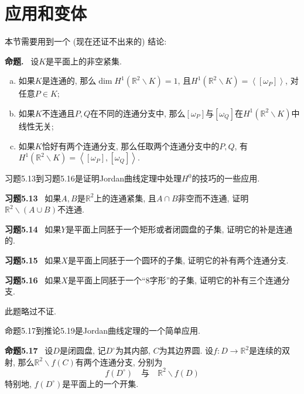 \documentclass[11pt]{article}
\theoremstyle{definition}\newtheorem*{analyse}{分析}
\theoremstyle{remark}\newtheorem{rem*}{评注}
\newenvironment{env}[1]{\par\vspace{1em}\noindent\textbf{#1}\ }{\par\vspace{1em}}
\begin{document}
\section{应用和变体}

本节需要用到一个 (现在还证不出来的) 结论:
\begin{env}{命题.}
    设$K$是平面上的非空紧集.
    \begin{enumerate}[(a)]
        \item 如果$K$是连通的, 那么$\dim H^1(\mathbb{R}^2\backslash K)=1$, 且$H^1(\mathbb{R}^2\backslash K)=\left\langle[\omega_P]\right\rangle$, 对任意$P\in K$;
        \item 如果$K$不连通且$P,Q$在不同的连通分支中, 那么$[\omega_P]$与$[\omega_Q]$在$H^1(\mathbb{R}^2\backslash K)$中线性无关;
        \item 如果$K$恰好有两个连通分支, 那么任取两个连通分支中的$P,Q$, 有$H^1(\mathbb{R}^2\backslash K)=\left\langle[\omega_P],[\omega_Q]\right\rangle$.
    \end{enumerate}
\end{env}

习题5.13到习题5.16是证明Jordan曲线定理中处理$H^0$的技巧的一些应用.
\begin{env}{习题5.13}
    如果$A,B$是$\mathbb{R}^2$上的连通紧集, 且$A\cap B$非空而不连通, 证明$\mathbb{R}^2\backslash(A\cup B)$不连通.
\end{env}

\begin{env}{习题5.14}
    如果$Y$是平面上同胚于一个矩形或者闭圆盘的子集, 证明它的补是连通的.
\end{env}

\begin{env}{习题5.15}
    如果$X$是平面上同胚于一个圆环的子集, 证明它的补有两个连通分支.
\end{env}

\begin{env}{习题5.16}
    如果$X$是平面上同胚于一个``$8$字形''的子集, 证明它的补有三个连通分支.
\end{env}
此题略过不证.

命题5.17到推论5.19是Jordan曲线定理的一个简单应用.
\begin{env}{命题5.17}
    设$D$是闭圆盘, 记$D^\circ$为其内部, $C$为其边界圆.
    设$f:D\to\mathbb{R}^2$是连续的双射, 那么$\mathbb{R}^2\backslash f(C)$有两个连通分支, 分别为
    \[f(D^\circ)\quad\text{与}\quad\mathbb{R}^2\backslash f(D)\]
    特别地, $f(D^\circ)$是平面上的一个开集.
\end{env}
\end{document}
